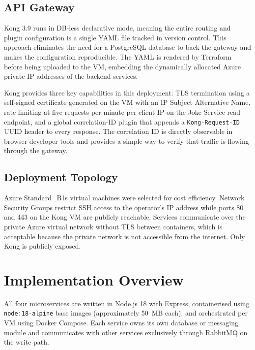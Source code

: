\documentclass[12pt,a4paper]{article}
\begin{document}
\subsection{API Gateway}

Kong 3.9 runs in DB-less declarative mode, meaning the entire routing and plugin configuration is a single YAML file tracked in version control. This approach eliminates the need for a PostgreSQL database to back the gateway and makes the configuration reproducible. The YAML is rendered by Terraform before being uploaded to the VM, embedding the dynamically allocated Azure private IP addresses of the backend services.

Kong provides three key capabilities in this deployment: TLS termination using a self-signed certificate generated on the VM with an IP Subject Alternative Name, rate limiting at five requests per minute per client IP on the Joke Service read endpoint, and a global correlation-ID plugin that appends a \texttt{Kong-Request-ID} UUID header to every response. The correlation ID is directly observable in browser developer tools and provides a simple way to verify that traffic is flowing through the gateway.

\subsection{Deployment Topology}

Azure Standard\_B1s virtual machines were selected for cost efficiency. Network Security Groups restrict SSH access to the operator's IP address while ports 80 and 443 on the Kong VM are publicly reachable. Services communicate over the private Azure virtual network without TLS between containers, which is acceptable because the private network is not accessible from the internet. Only Kong is publicly exposed.

\section{Implementation Overview}

All four microservices are written in Node.js 18 with Express, containerised using \texttt{node:18-alpine} base images (approximately 50~MB each), and orchestrated per VM using Docker Compose. Each service owns its own database or messaging module and communicates with other services exclusively through RabbitMQ on the write path.
\end{document}
